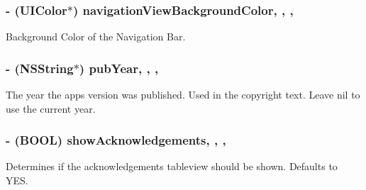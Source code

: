 \subsubsection[{navigation\+View\+Background\+Color}]{\setlength{\rightskip}{0pt plus 5cm}-\/ (U\+I\+Color$\ast$) navigation\+View\+Background\+Color\hspace{0.3cm}{\ttfamily [read]}, {\ttfamily [write]}, {\ttfamily [nonatomic]}, {\ttfamily [strong]}}\label{interface_r_f_about_view_controller_adccd7e7ce64f8665a82cb691e2a9c2da}
Background Color of the Navigation Bar. \hypertarget{interface_r_f_about_view_controller_ad6206e0aefd08e224ea61f8f9a85a93a}{}
\subsubsection[{pub\+Year}]{\setlength{\rightskip}{0pt plus 5cm}-\/ (N\+S\+String$\ast$) pub\+Year\hspace{0.3cm}{\ttfamily [read]}, {\ttfamily [write]}, {\ttfamily [nonatomic]}, {\ttfamily [strong]}}\label{interface_r_f_about_view_controller_ad6206e0aefd08e224ea61f8f9a85a93a}
The year the app\textquotesingle{}s version was published. Used in the copyright text. Leave nil to use the current year. \hypertarget{interface_r_f_about_view_controller_aec7d35dbeb254a3cc1775e9d18809fb7}{}
\subsubsection[{show\+Acknowledgements}]{\setlength{\rightskip}{0pt plus 5cm}-\/ (B\+O\+O\+L) show\+Acknowledgements\hspace{0.3cm}{\ttfamily [read]}, {\ttfamily [write]}, {\ttfamily [nonatomic]}, {\ttfamily [assign]}}\label{interface_r_f_about_view_controller_aec7d35dbeb254a3cc1775e9d18809fb7}
Determines if the acknowledgements tableview should be shown. Defaults to Y\+E\+S. \hypertarget{interface_r_f_about_view_controller_a84a5073683af56bf6023d46b63f45ef5}{}
